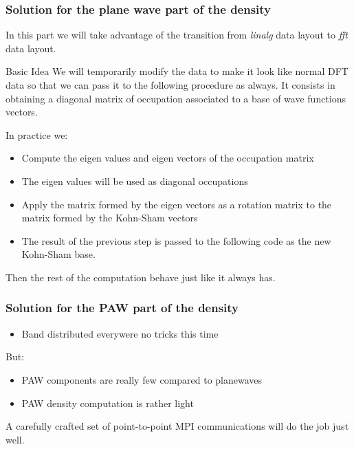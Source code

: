 \begin{frame}
  \frametitle{Solution for the plane wave part of the density}
  In this part we will take advantage of the transition from \emph{linalg}
  data layout to \emph{fft} data layout.
  
  \begin{block}{Basic Idea}
    We will temporarily modify the data to make it look like normal DFT data so
    that we can pass it to the following procedure as always.
    It consists in obtaining a diagonal matrix of occupation associated to
    a base of wave functions vectors.
  \end{block}
\end{frame}

\begin{frame}
  In practice we:
  \begin{itemize}
    \item Compute the eigen values and eigen vectors of the occupation matrix
    \item The eigen values will be used as diagonal occupations 
    \item Apply the matrix formed by the eigen vectors as a rotation matrix to
      the matrix formed by the Kohn-Sham vectors
    \item The result of the previous step is passed to the following code as the new
      Kohn-Sham base.
  \end{itemize}

  Then the rest of the computation behave just like it always has.
\end{frame}

\begin{frame}
  \frametitle{Solution for the PAW part of the density}
  \begin{itemize}
    \item Band distributed everywere \Rightarrow no tricks this time
  \end{itemize}
  But:
  \begin{itemize}
    \item PAW components are really few compared to planewaves
    \item PAW density computation is rather light
  \end{itemize}
  A carefully crafted set of point-to-point MPI communications will do the job
  just well.
\end{frame}


